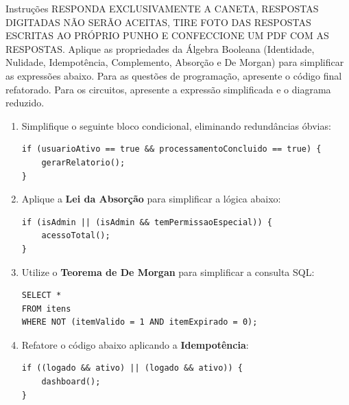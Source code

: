 \documentclass[12pt]{article}
\begin{document}
\begin{block}{Instruções}
  RESPONDA EXCLUSIVAMENTE A CANETA, RESPOSTAS DIGITADAS NÃO SERÃO ACEITAS, TIRE FOTO DAS RESPOSTAS ESCRITAS AO PRÓPRIO PUNHO E CONFECCIONE UM PDF COM AS RESPOSTAS.
Aplique as propriedades da Álgebra Booleana (Identidade, Nulidade, Idempotência, Complemento, Absorção e De Morgan) para simplificar as expressões abaixo. Para as questões de programação, apresente o código final refatorado. Para os circuitos, apresente a expressão simplificada e o diagrama reduzido.
\end{block}


\begin{enumerate}[label=\textbf{\arabic*.}]

\item Simplifique o seguinte bloco condicional, eliminando redundâncias óbvias:
\begin{codeblock}
\begin{verbatim}
if (usuarioAtivo == true && processamentoConcluido == true) {
    gerarRelatorio();
}
\end{verbatim}
\end{codeblock}

\vspace{0.1cm}


\item Aplique a \textbf{Lei da Absorção} para simplificar a lógica abaixo:
\begin{codeblock}
\begin{verbatim}
if (isAdmin || (isAdmin && temPermissaoEspecial)) {
    acessoTotal();
}
\end{verbatim}
\end{codeblock}

\vspace{0.1cm}


\item Utilize o \textbf{Teorema de De Morgan} para simplificar a consulta SQL:

\begin{codeblock}
\begin{verbatim}
SELECT * 
FROM itens
WHERE NOT (itemValido = 1 AND itemExpirado = 0);
\end{verbatim}
\end{codeblock}


\vspace{0.1cm}


\item Refatore o código abaixo aplicando a \textbf{Idempotência}:
\begin{codeblock}
\begin{verbatim}
if ((logado && ativo) || (logado && ativo)) {
    dashboard();
}
\end{verbatim}
\end{codeblock}


\end{enumerate}
\end{document}
